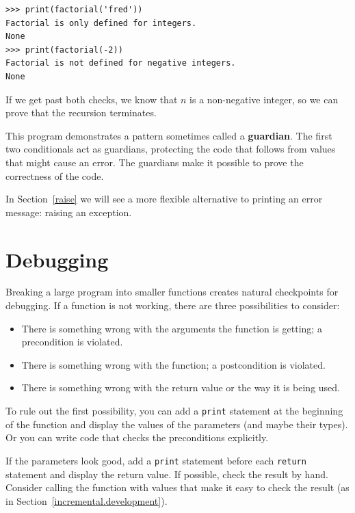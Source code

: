 \documentclass[10pt]{book}
\begin{document}
\begin{verbatim}
>>> print(factorial('fred'))
Factorial is only defined for integers.
None
>>> print(factorial(-2))
Factorial is not defined for negative integers.
None
\end{verbatim}
% 
If we get past both checks, we know that $n$ is a non-negative integer, so we can prove that the recursion terminates.

This program demonstrates a pattern sometimes called a {\bf guardian}.
The first two conditionals act as guardians, protecting the code that
follows from values that might cause an error.  The guardians make it
possible to prove the correctness of the code.

In Section~\ref{raise} we will see a more flexible alternative to printing
an error message: raising an exception.


\section{Debugging}
\label{factdebug}

Breaking a large program into smaller functions creates natural
checkpoints for debugging.  If a function is not
working, there are three possibilities to consider:

\begin{itemize}

\item There is something wrong with the arguments the function
is getting; a precondition is violated.

\item There is something wrong with the function; a postcondition
is violated.

\item There is something wrong with the return value or the
way it is being used.

\end{itemize}

To rule out the first possibility, you can add a {\tt print} statement
at the beginning of the function and display the values of the
parameters (and maybe their types).  Or you can write code
that checks the preconditions explicitly.

If the parameters look good, add a {\tt print} statement before each
{\tt return} statement and display the return value.  If
possible, check the result by hand.  Consider calling the
function with values that make it easy to check the result
(as in Section~\ref{incremental.development}).
\end{document}
